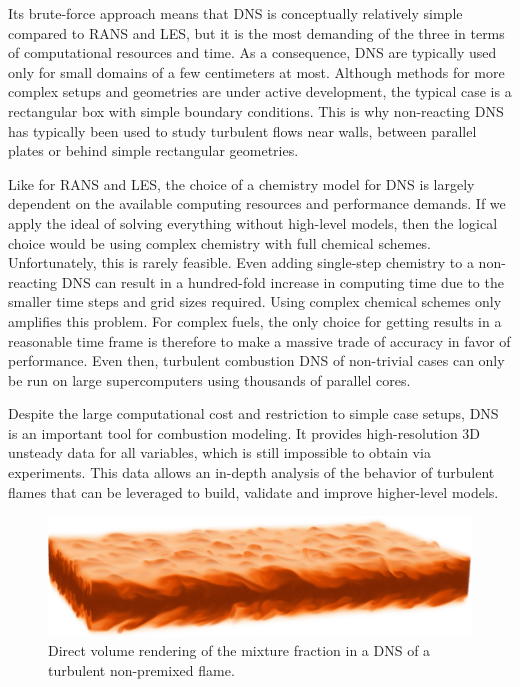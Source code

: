 %
Its brute-force approach means that \ac{DNS} is conceptually relatively simple
compared to \ac{RANS} and \ac{LES}, but it is the most demanding of the three
in terms of computational resources and time.
%
As a consequence, \ac{DNS} are typically used only for small domains of a few
centimeters at most.
%
Although methods for more complex setups and geometries are under active
development, the typical case is a rectangular box with simple boundary
conditions.
%
This is why non-reacting \ac{DNS} has typically been used to study turbulent
flows near walls, between parallel plates or behind simple rectangular
geometries.
%

%
Like for \ac{RANS} and \ac{LES}, the choice of a chemistry model for \ac{DNS} is
largely dependent on the available computing resources and performance demands.
%
If we apply the ideal of solving everything without high-level models, then the
logical choice would be using complex chemistry with full chemical schemes.
%
Unfortunately, this is rarely feasible.
%
Even adding single-step chemistry to a non-reacting \ac{DNS} can result in a
hundred-fold increase in computing time due to the smaller time steps and grid
sizes required.
%
Using complex chemical schemes only amplifies this problem.
%
For complex fuels, the only choice for getting results in a reasonable time
frame is therefore to make a massive trade of accuracy in favor of performance.
%
Even then, turbulent combustion \ac{DNS} of non-trivial cases can only be run
on large supercomputers using thousands of parallel cores.
%

%
Despite the large computational cost and restriction to simple case setups,
\ac{DNS} is an important tool for combustion modeling.
%
It provides high-resolution \ac{3D} unsteady data for all variables, which is
still impossible to obtain via experiments.
%
This data allows an in-depth analysis of the behavior of turbulent flames that
can be leveraged to build, validate and improve higher-level models.
%
\begin{figure}[t]
    \centering
    \includegraphics[width=\textwidth]{figures/Hawkes_VolRend.png}
    \caption{Direct volume rendering of the mixture fraction in a
    \ac{DNS} of a turbulent non-premixed flame.}
    \label{fig:turbulent_diffusion_flame_dns}
\end{figure}
%

